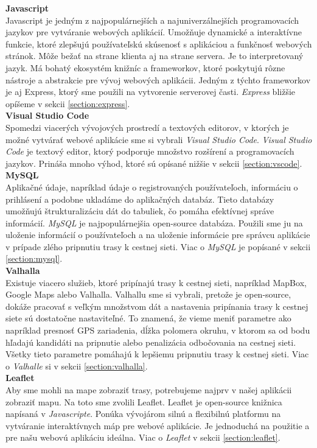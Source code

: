 \noindent\textbf{Javascript}\cite{javascript}\\
\indent Javascript je jedným z najpopulárnejších a najuniverzálnejších programovacích jazykov pre vytváranie webových aplikácií. Umožňuje dynamické a interaktívne funkcie, ktoré zlepšujú používateľskú skúsenosť s aplikáciou a funkčnosť webových stránok. Môže bežať na strane klienta aj na strane servera. Je to interpretovaný jazyk. Má bohatý ekosystém knižníc a frameworkov, ktoré poskytujú rôzne nástroje a abstrakcie pre vývoj webových aplikácii. Jedným z týchto frameworkov je aj Express, ktorý sme použili na vytvorenie serverovej časti. \textit{Express} bližšie opíšeme v sekcii \ref{section:express}.\\

\noindent\textbf{Visual Studio Code}\\
\indent Spomedzi viacerých vývojových prostredí a textových editorov, v ktorých je možné vytvárať webové aplikácie sme si vybrali \textit{Visual Studio Code}. \textit{Visual Studio Code} je textový editor, ktorý podporuje množstvo rozšírení a programovacích jazykov. Prináša mnoho výhod, ktoré sú opísané nižšie v sekcii \ref{section:vscode}.\\

\noindent\textbf{MySQL}\\
\indent Aplikačné údaje, napríklad údaje o registrovaných používateľoch, informáciu o prihlásení a podobne ukladáme do aplikačných databáz. Tieto databázy umožňujú štrukturalizáciu dát do tabuliek, čo pomáha efektívnej správe informácií. \textit{MySQL} je najpopulárnejšia open-source databáza\cite{mysql}. Použili sme ju na uloženie informácií o používateľoch a na uloženie informácie pre správcu aplikácie v prípade zlého pripnutiu trasy k cestnej sieti. Viac o \textit{MySQL} je popísané v sekcii \ref{section:mysql}.\\

\noindent\textbf{Valhalla}\\
\indent Existuje viacero služieb, ktoré pripínajú trasy k cestnej sieti, napríklad MapBox, Google Maps alebo Valhalla. Valhallu sme si vybrali, pretože je open-source,  dokáže pracovať s veľkým množstvom dát a nastavenia pripínania trasy k cestnej siete sú dostatočne nastaviteľné. To znamená, že vieme meniť parametre ako napríklad presnosť GPS zariadenia, dĺžka polomera okruhu, v ktorom sa od bodu hľadajú kandidáti na pripnutie alebo penalizácia odbočovania na cestnej sieti. Všetky tieto parametre pomáhajú k lepšiemu pripnutiu trasy k cestnej sieti. Viac o \textit{Valhalle} si v sekcii \ref{section:valhalla}.\\

\noindent\textbf{Leaflet}\\
\indent Aby sme mohli na mape zobraziť trasy, potrebujeme najprv v našej aplikácii zobraziť mapu. Na toto sme zvolili Leaflet. Leaflet je open-source knižnica napísaná v \textit{Javascripte}. Ponúka vývojárom silnú a flexibilnú platformu na vytváranie interaktívnych máp pre webové aplikácie. Je jednoduchá na použitie a pre našu webovú aplikáciu ideálna. Viac o \textit{Leaflet} v sekcii \ref{section:leaflet}.